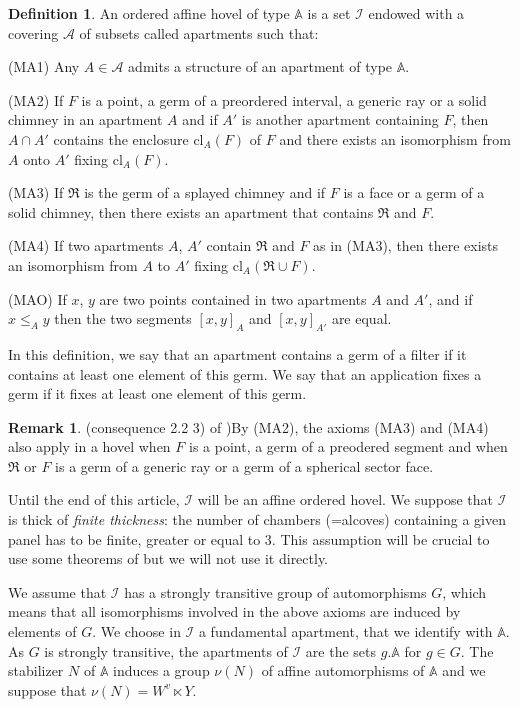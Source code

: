 \documentclass[12pt]{article}
\theoremstyle{plain}
\theoremstyle{definition}
\newtheorem{defn}[thm]{Definition}
\newtheorem{rque}[thm]{Remark}
\newcommand{\A}{\mathbb{A}}
\newcommand{\I}{\mathcal{I}}
\begin{document}
\begin{defn}
An ordered affine hovel of type $\A$ is a set $\mathcal{I}$ endowed with a covering $\mathcal{A}$ of subsets called apartments such that: 

(MA1) Any $A\in \mathcal{A}$ admits a structure of an apartment of type $\A$.

(MA2) If $F$ is a point, a germ of a preordered interval, a generic ray or a solid chimney in an apartment $A$ and if $A'$ is another apartment containing $F$, then $A\cap A'$ contains the enclosure $\mathrm{cl}_A(F)$ of $F$ and there exists an isomorphism from $A$ onto $A'$ fixing $\mathrm{cl}_A(F)$.

(MA3) If $\mathfrak{R}$ is the germ of a splayed chimney and if $F$ is a face or a germ of a solid chimney, then there exists an apartment that contains $\mathfrak{R}$ and $F$.

(MA4) If two apartments $A$, $A'$ contain $\mathfrak{R}$ and $F$ as in (MA3), then there exists an isomorphism from $A$ to $A'$ fixing $\mathrm{cl}_A(\mathfrak{R}\cup F)$.

(MAO) If $x$, $y$ are two points contained in two apartments $A$ and $A'$, and if $x\leq_{A} y$ then the two segments $[x,y]_A$ and $[x,y]_{A'}$ are equal.
\end{defn}


In this definition, we say that an apartment contains a germ of a filter if it contains at least one element of this germ. We say that an application fixes a germ if it fixes at least one element of this germ.

\begin{rque}(consequence 2.2 3) of \cite{rousseau2011masures})\label{rque axioms MA3 et MA4 modifiés}
By (MA2), the axioms (MA3) and (MA4) also apply in a hovel when $F$ is a point, a germ of a preodered segment and when $\mathfrak{R}$ or $F$ is a germ of a generic ray or a germ of a spherical sector face.
\end{rque}

\vspace{3mm}
Until the end of this article, $\I$ will be an affine ordered hovel. We suppose that $\I$ is thick of \textit{finite thickness}: the number of chambers (=alcoves) containing a given panel has to be finite, greater or equal to $3$. This assumption will be crucial to use some theorems of \cite{gaussent2014spherical} but we will not use it directly. 

We assume that $\I$ has a strongly transitive group of automorphisms $G$, which means that all isomorphisms involved in the above axioms are induced by elements of $G$. We choose in $\I$ a fundamental apartment, that we identify with $\A$. As $G$ is strongly transitive, the apartments of $\I$ are the sets $g.\A$ for $g\in G$. The stabilizer $N$ of $\A$ induces a group $\nu(N)$ of affine automorphisms of $\A$ and we suppose that $\nu(N)=W^v\ltimes Y$.
\end{document}
